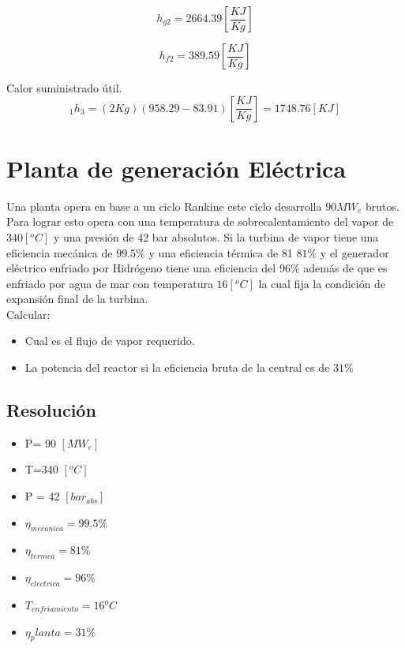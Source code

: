 \documentclass[]{article}
\begin{document}
\begin{equation}
  h_{g2}=2664.39 [\frac{KJ}{Kg}]
\end{equation}

\begin{equation}
h_{f2}=389.59 [\frac{KJ}{Kg}]
\end{equation}

Calor suministrado útil.\\

\begin{equation}
_1h_3=(2Kg)(958.29-83.91)[\frac{KJ}{Kg}]=1748.76[KJ]
\end{equation}

\section{Planta de generación Eléctrica}

Una planta opera en base a un ciclo Rankine este ciclo desarrolla $90 MW_e$ brutos. Para lograr esto opera con una temperatura de sobrecalentamiento del vapor de $340[^oC]$ y una presión de 42 bar absolutos. Si la turbina de vapor tiene una eficiencia mecánica de $99.5 \%$ y una eficiencia térmica de 81 $81\%$ y el generador eléctrico enfriado por Hidrógeno tiene una eficiencia del $96\%$ además de que es enfriado por agua de mar con temperatura $16[^oC]$ la cual fija la condición de expansión final de la turbina.\\

Calcular:\\

\begin{itemize}
	\item Cual es el flujo de vapor requerido.\\
	\item La potencia del reactor si la eficiencia bruta de la central es de $31 \%$   
\end{itemize}

 \subsection{Resolución}
 
 \begin{itemize}
 	\item P= 90 $[MW_e]$
 	\item T=340 $[^oC]$
 	\item P = 42 $[bar_{abs}]$
 	\item $\eta_{mecanica}=99.5 \%$
 	\item $\eta_{termca}=81 \%$
 	\item $\eta_{electrica}=96 \%$
 	\item $T_{enfriamiento}=16^oC$
 	\item $\eta_planta=31\%$
 \end{itemize}
\end{document}
